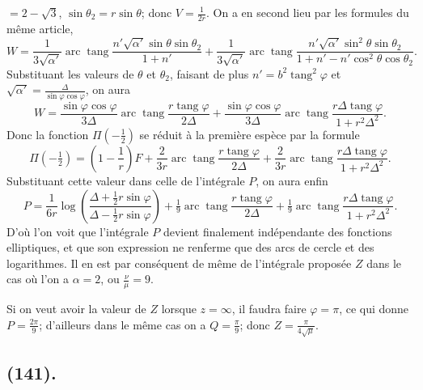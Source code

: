 \documentclass{article}
\begin{document}
$=2-\sqrt{3}$, $\sin\theta_{2}=r\sin\theta$; donc $V=\frac{1}{2r}$. On a en second lieu par les formules du même article,
\[ W=\frac{1}{3\sqrt{\alpha'}}\operatorname{arc}\operatorname{tang}\frac{n'\sqrt{\alpha'}\sin\theta\sin\theta_{2}}{1+n'}+\frac{1}{3\sqrt{\alpha'}}\operatorname{arc}\operatorname{tang}\frac{n'\sqrt{\alpha'}\sin^{2}\theta\sin\theta_{2}}{1+n'-n'\cos^{2}\theta\cos\theta_{2}}. \]
Substituant les valeurs de $\theta$ et $\theta_{2}$, faisant de plus $n'=b^{2}\operatorname{tang}^{2}\varphi$ et $\sqrt{\alpha'}=\frac{\Delta}{\sin\varphi\cos\varphi}$, on aura
\[ W=\frac{\sin\varphi\cos\varphi}{3\Delta}\operatorname{arc}\operatorname{tang}\frac{r\operatorname{tang}\varphi}{2\Delta}+\frac{\sin\varphi\cos\varphi}{3\Delta}\operatorname{arc}\operatorname{tang}\frac{r\Delta\operatorname{tang}\varphi}{1+r^{2}\Delta^{2}}. \]
Donc la fonction $\Pi(-\frac{1}{2})$ se réduit à la première espèce par la formule
\[ \Pi(-\tfrac{1}{2})=\left(1-\frac{1}{r}\right)F+\frac{2}{3r}\operatorname{arc}\operatorname{tang}\frac{r\operatorname{tang}\varphi}{2\Delta}+\frac{2}{3r}\operatorname{arc}\operatorname{tang}\frac{r\Delta\operatorname{tang}\varphi}{1+r^{2}\Delta^{2}}. \]
Substituant cette valeur dans celle de l'intégrale $P$, on aura enfin
\[ P=\frac{1}{6r}\log\left(\frac{\Delta+\frac{1}{2}r\sin\varphi}{\Delta-\frac{1}{2}r\sin\varphi}\right)+\tfrac{1}{9}\operatorname{arc}\operatorname{tang}\frac{r\operatorname{tang}\varphi}{2\Delta}+\tfrac{1}{9}\operatorname{arc}\operatorname{tang}\frac{r\Delta\operatorname{tang}\varphi}{1+r^{2}\Delta^{2}}. \]
D'où l'on voit que l'intégrale $P$ devient finalement indépendante des fonctions elliptiques, et que son expression ne renferme que des arcs de cercle et des logarithmes. Il en est par conséquent de même de l'intégrale proposée $Z$ dans le cas où l'on a $\alpha=2$, ou $\frac{\nu}{\mu}=9$.

Si on veut avoir la valeur de $Z$ lorsque $z=\infty$, il faudra faire $\varphi=\pi$, ce qui donne $P=\frac{2\pi}{9}$; d'ailleurs dans le même cas on a $Q=\frac{\pi}{9}$; donc $Z=\frac{\pi}{4\sqrt{\mu}}$.

\subsection*{(141).}
\end{document}
